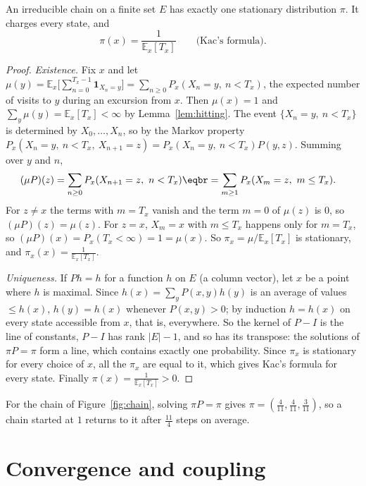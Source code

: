 \begin{theorem}\label{thm:stationary}
An irreducible chain on a finite set $E$ has exactly one stationary distribution $\pi$. It charges every state, and
\[
\pi(x)=\frac1{\mathbb E_x[T_x]}\qquad\text{(Kac's formula).}
\]
\end{theorem}
\begin{proof}
\emph{Existence.} Fix $x$ and let $\mu(y)=\mathbb E_x\bigl[\sum_{n=0}^{T_x-1}\mathbf 1_{X_n=y}\bigr]=\sum_{n\ge0}P_x(X_n=y,\ n<T_x)$, the expected number of visits to $y$ during an
excursion from $x$. Then $\mu(x)=1$ and $\sum_y\mu(y)=\mathbb E_x[T_x]<\infty$ by Lemma~\ref{lem:hitting}. The event $\{X_n=y,\ n<T_x\}$ is determined by $X_0,\dots,X_n$,
so by the Markov property $P_x(X_n=y,\ n<T_x,\ X_{n+1}=z)=P_x(X_n=y,\ n<T_x)P(y,z)$. Summing over $y$ and $n$,
\[
\begin{aligned}(\mu P)(z)&=\sum_{n\ge0}P_x(X_{n+1}=z,\ n<T_x)\eqbr=\sum_{m\ge1}P_x(X_m=z,\ m\le T_x).\end{aligned}
\]
For $z\ne x$ the terms with $m=T_x$ vanish and the term $m=0$ of $\mu(z)$ is $0$, so $(\mu P)(z)=\mu(z)$. For $z=x$, $X_m=x$ with $m\le T_x$ happens only for $m=T_x$,
so $(\mu P)(x)=P_x(T_x<\infty)=1=\mu(x)$. So $\pi_x=\mu/\mathbb E_x[T_x]$ is stationary, and $\pi_x(x)=\frac1{\mathbb E_x[T_x]}$.

\emph{Uniqueness.} If $Ph=h$ for a function $h$ on $E$ (a column vector), let $x$ be a point where $h$ is maximal. Since $h(x)=\sum_yP(x,y)h(y)$
is an average of values $\le h(x)$, $h(y)=h(x)$ whenever $P(x,y)>0$; by induction $h=h(x)$ on every state accessible from $x$, that is,
everywhere. So the kernel of $P-I$ is the line of constants, $P-I$ has rank $|E|-1$, and so has its transpose: the solutions of
$\pi P=\pi$ form a line, which contains exactly one probability. Since $\pi_x$ is stationary for every choice of $x$, all the $\pi_x$ are
equal to it, which gives Kac's formula for every state. Finally $\pi(x)=\frac1{\mathbb E_x[T_x]}>0$.
\end{proof}

For the chain of Figure~\ref{fig:chain}, solving $\pi P=\pi$ gives $\pi=(\frac4{11},\frac4{11},\frac3{11})$, so a chain started at $1$ returns to it after
$\frac{11}4$ steps on average.

\section{Convergence and coupling}

